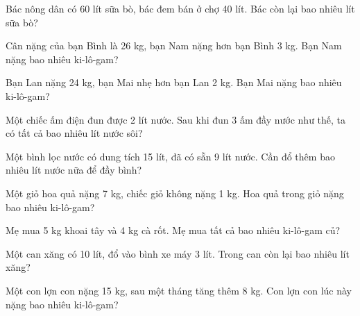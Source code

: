 \begin{ex}
Bác nông dân có 60 lít sữa bò, bác đem bán ở chợ 40 lít. Bác còn lại bao nhiêu lít sữa bò?
\end{ex}

\begin{ex}
Cân nặng của bạn Bình là 26 kg, bạn Nam nặng hơn bạn Bình 3 kg. Bạn Nam nặng bao nhiêu ki-lô-gam?
\end{ex}

\begin{ex}
Bạn Lan nặng 24 kg, bạn Mai nhẹ hơn bạn Lan 2 kg. Bạn Mai nặng bao nhiêu ki-lô-gam?
\end{ex}

\begin{ex}
Một chiếc ấm điện đun được 2 lít nước. Sau khi đun 3 ấm đầy nước như thế, ta có tất cả bao nhiêu lít nước sôi?
\end{ex}

\begin{ex}
Một bình lọc nước có dung tích 15 lít, đã có sẵn 9 lít nước. Cần đổ thêm bao nhiêu lít nước nữa để đầy bình?
\end{ex}

\begin{ex}
Một giỏ hoa quả nặng 7 kg, chiếc giỏ không nặng 1 kg. Hoa quả trong giỏ nặng bao nhiêu ki-lô-gam?
\end{ex}

\begin{ex}
Mẹ mua 5 kg khoai tây và 4 kg cà rốt. Mẹ mua tất cả bao nhiêu ki-lô-gam củ?
\end{ex}

\begin{ex}
Một can xăng có 10 lít, đổ vào bình xe máy 3 lít. Trong can còn lại bao nhiêu lít xăng?
\end{ex}

\begin{ex}
Một con lợn con nặng 15 kg, sau một tháng tăng thêm 8 kg. Con lợn con lúc này nặng bao nhiêu ki-lô-gam?
\end{ex}

